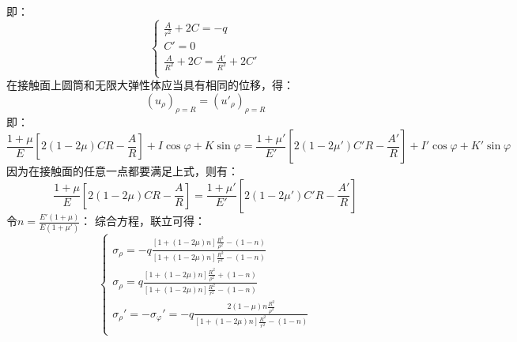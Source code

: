 即：\[\begin{cases}
\frac{A}{r^2}+2C=-q\\
C'=0\\
\frac{A}{R^2}+2C=\frac{A'}{R^2}+2C'\\
\end{cases}\]
在接触面上圆筒和无限大弹性体应当具有相同的位移，得：\[\left( u_{\rho} \right) _{\rho =R}=\left( u'_{\rho} \right) _{\rho =R}\]
即：\[\frac{1+\mu}{E}\left[ 2\left( 1-2\mu \right) CR-\frac{A}{R} \right] +I\cos \varphi +K\sin \varphi =\frac{1+\mu '}{E'}\left[ 2\left( 1-2\mu ' \right) C'R-\frac{A'}{R} \right] +I'\cos \varphi +K'\sin \varphi \]
因为在接触面的任意一点都要满足上式，则有：\[\frac{1+\mu}{E}\left[ 2\left( 1-2\mu \right) CR-\frac{A}{R} \right] =\frac{1+\mu '}{E'}\left[ 2\left( 1-2\mu ' \right) C'R-\frac{A'}{R} \right] \]
令$n=\frac{E'\left( 1+\mu \right)}{E\left( 1+\mu ' \right)}$：
综合方程，联立可得：
\begin{equation}
\begin{cases}
\sigma _{\rho}=-q\frac{\left[ 1+\left( 1-2\mu \right) n \right] \frac{R^2}{\rho ^2}-\left( 1-n \right)}{\left[ 1+\left( 1-2\mu \right) n \right] \frac{R^2}{r^2}-\left( 1-n \right)}\\
\sigma _{\rho}=q\frac{\left[ 1+\left( 1-2\mu \right) n \right] \frac{R^2}{\rho ^2}+\left( 1-n \right)}{\left[ 1+\left( 1-2\mu \right) n \right] \frac{R^2}{r^2}-\left( 1-n \right)}\\
\sigma _{\rho}'=-\sigma _{\varphi}'=-q\frac{2\left( 1-\mu \right) n\frac{R^2}{\rho ^2}}{\left[ 1+\left( 1-2\mu \right) n \right] \frac{R^2}{r^2}-\left( 1-n \right)}\\
\end{cases}
\end{equation}

